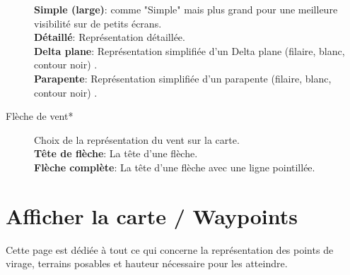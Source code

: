\begin{description}
  {\bf Simple (large)}: comme "Simple" mais plus grand pour une meilleure visibilité sur de petits écrans.\\
  {\bf Détaillé}: Représentation détaillée.\\
 {\bf Delta plane}: Représentation simplifiée d'un Delta plane (filaire, blanc, contour noir) .\\
 {\bf Parapente}: Représentation simplifiée d'un parapente (filaire, blanc, contour noir) .
\item[Flèche de vent*]  Choix de la représentation du vent sur la carte. \\
  {\bf Tête de flèche}: La tête d'une flèche. \\
  {\bf Flèche complète}: La tête d'une flèche avec une ligne pointillée.
\end{description}


\section{Afficher la carte / Waypoints}\label{sec:waypoint-display}

Cette page est dédiée à tout ce qui concerne la représentation des points de virage, terrains posables et hauteur nécessaire pour les atteindre.

